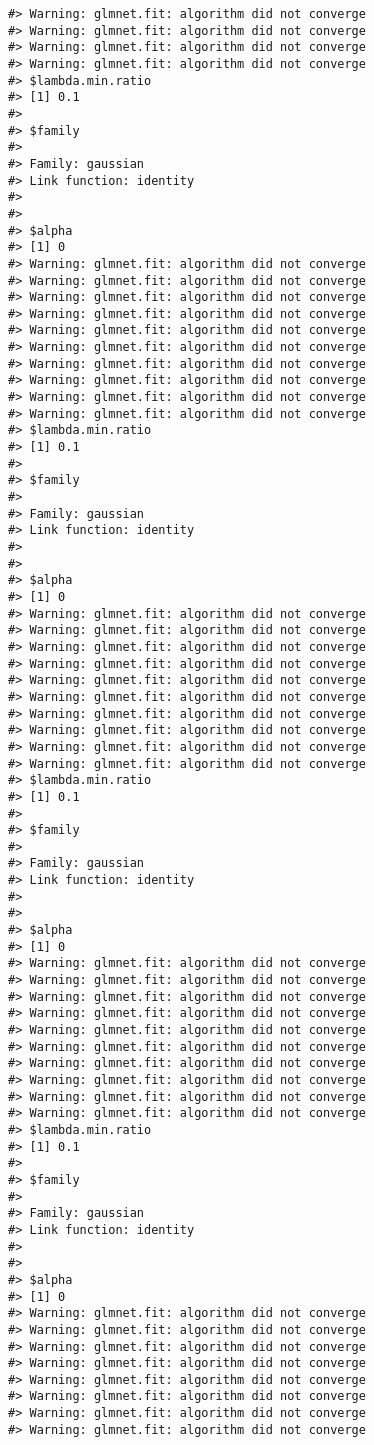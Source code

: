 \documentclass[
  article]{jss}
\begin{document}
\begin{verbatim}
#> Warning: glmnet.fit: algorithm did not converge
#> Warning: glmnet.fit: algorithm did not converge
#> Warning: glmnet.fit: algorithm did not converge
#> Warning: glmnet.fit: algorithm did not converge
#> $lambda.min.ratio
#> [1] 0.1
#> 
#> $family
#> 
#> Family: gaussian 
#> Link function: identity 
#> 
#> 
#> $alpha
#> [1] 0
#> Warning: glmnet.fit: algorithm did not converge
#> Warning: glmnet.fit: algorithm did not converge
#> Warning: glmnet.fit: algorithm did not converge
#> Warning: glmnet.fit: algorithm did not converge
#> Warning: glmnet.fit: algorithm did not converge
#> Warning: glmnet.fit: algorithm did not converge
#> Warning: glmnet.fit: algorithm did not converge
#> Warning: glmnet.fit: algorithm did not converge
#> Warning: glmnet.fit: algorithm did not converge
#> Warning: glmnet.fit: algorithm did not converge
#> $lambda.min.ratio
#> [1] 0.1
#> 
#> $family
#> 
#> Family: gaussian 
#> Link function: identity 
#> 
#> 
#> $alpha
#> [1] 0
#> Warning: glmnet.fit: algorithm did not converge
#> Warning: glmnet.fit: algorithm did not converge
#> Warning: glmnet.fit: algorithm did not converge
#> Warning: glmnet.fit: algorithm did not converge
#> Warning: glmnet.fit: algorithm did not converge
#> Warning: glmnet.fit: algorithm did not converge
#> Warning: glmnet.fit: algorithm did not converge
#> Warning: glmnet.fit: algorithm did not converge
#> Warning: glmnet.fit: algorithm did not converge
#> Warning: glmnet.fit: algorithm did not converge
#> $lambda.min.ratio
#> [1] 0.1
#> 
#> $family
#> 
#> Family: gaussian 
#> Link function: identity 
#> 
#> 
#> $alpha
#> [1] 0
#> Warning: glmnet.fit: algorithm did not converge
#> Warning: glmnet.fit: algorithm did not converge
#> Warning: glmnet.fit: algorithm did not converge
#> Warning: glmnet.fit: algorithm did not converge
#> Warning: glmnet.fit: algorithm did not converge
#> Warning: glmnet.fit: algorithm did not converge
#> Warning: glmnet.fit: algorithm did not converge
#> Warning: glmnet.fit: algorithm did not converge
#> Warning: glmnet.fit: algorithm did not converge
#> Warning: glmnet.fit: algorithm did not converge
#> $lambda.min.ratio
#> [1] 0.1
#> 
#> $family
#> 
#> Family: gaussian 
#> Link function: identity 
#> 
#> 
#> $alpha
#> [1] 0
#> Warning: glmnet.fit: algorithm did not converge
#> Warning: glmnet.fit: algorithm did not converge
#> Warning: glmnet.fit: algorithm did not converge
#> Warning: glmnet.fit: algorithm did not converge
#> Warning: glmnet.fit: algorithm did not converge
#> Warning: glmnet.fit: algorithm did not converge
#> Warning: glmnet.fit: algorithm did not converge
#> Warning: glmnet.fit: algorithm did not converge

\end{verbatim}
\end{document}
